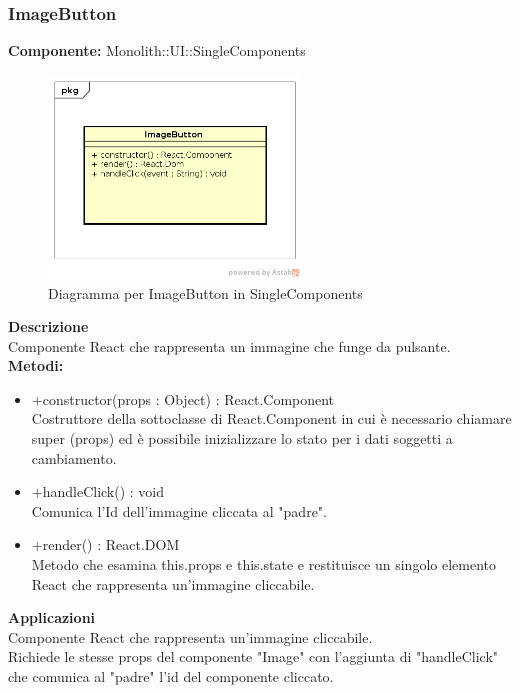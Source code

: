 \clearpage

\subsubsection{ImageButton}
\textbf{Componente:}  Monolith::UI::SingleComponents\\
   \FloatBarrier
   \begin{figure}[ht]
   \centering
   \includegraphics[width=0.6\textwidth]{img/single-ImageButton.png}
   \caption{{Diagramma per ImageButton in SingleComponents}}
\end{figure}
\FloatBarrier
\textbf{Descrizione}\\
Componente React che rappresenta un immagine che funge da pulsante. \\
\textbf{Metodi:} 
\begin{itemize}
\item +constructor(props : Object) : React.Component 
\\
Costruttore della sottoclasse di React.Component in cui è necessario chiamare super (props) ed è possibile inizializzare lo stato per i dati soggetti a cambiamento.
\item +handleClick() : void 
\\
Comunica l'Id dell'immagine cliccata al "padre". 
\item +render() : React.DOM 
\\
Metodo che esamina this.props e this.state e restituisce un singolo elemento React che rappresenta un'immagine cliccabile.
\end{itemize} 


\textbf{Applicazioni}\\
Componente React che rappresenta un'immagine cliccabile.\\ Richiede le stesse props del componente "Image" con l'aggiunta di "handleClick" che comunica al "padre" l'id del componente cliccato. 


